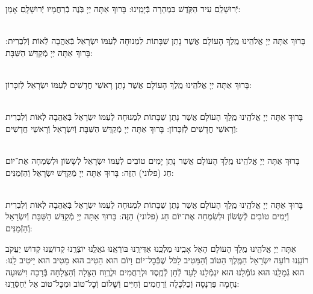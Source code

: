 \documentclass[twoside, openany, parskip=half, 11pt]{book}
\begin{document}
\begin{sometimes}
\begin{sometimes}
\end{sometimes}

יְֿרוּשָׁלַֽםִ עִיר הַקֹּֽדֶשׁ בִּמְהֵרָה בְּֿיָמֵֽינוּ: בָּרוּךְ אַתָּה יְיָ בֹּֽנֶה בְֿרַחֲמָיו יְֿרוּשָׁלָֽםִ אָמֵן:

\begin{sometimes}

\\
בָּרוּךְ אַתָּה יְיָ אֱלֹהֵֽינוּ מֶֽלֶךְ הָעוֹלָם אֲשֶׁר נָתַן שַׁבָּתוֹת לִמְנוּחָה לְֿעַמּוֹ יִשְׂרָאֵל בְּֿאַהֲבָה
לְֿאוֹת וְֿלִבְרִית: בָּרוּךְ אַתָּה יְיָ מְֿקַדֵּשׁ הַשַּׁבָּת:


\\
בָּרוּךְ אַתָּה יְיָ אֱלֹהֵֽינוּ מֶֽלֶךְ הָעוֹלָם
אֲשֶׁר נָתַן רָאשֵׁי חֳדָשִׁים לְֿעַמּוֹ יִשְׂרָאֵל לְֿזִכָּרוֹן:


\\
בָּרוּךְ אַתָּה יְיָ אֱלֹהֵֽינוּ מֶֽלֶךְ הָעוֹלָם
אֲשֶׁר נָתַן שַׁבָּתוֹת לִמְנוּחָה לְֿעַמּוֹ יִשְׂרָאֵל בְּֿאַהֲבָה לְֿאוֹת וְֿלִבְרִית וְֿרָאשֵׁי חֳדָשִׁים לְֿזִכָּרוֹן:
בָּרוּךְ אַתָּה יְיָ מְֿקַדֵּשׁ הַשַּׁבָּת וְֿיִשְׂרָאֵל וְֿרָאשֵׁי חֳדָשִׁים:

\\
בָּרוּךְ אַתָּה יְיָ אֱלֹהֵֽינוּ מֶֽלֶךְ הָעוֹלָם
אֲשֶׁר נָתַן יָמִים טוֹבִים לְֿעַמּוֹ יִשְׂרָאֵל
לְֿשָׂשׂוֹן וּלְשִׂמְחָה אֶת־יוֹם חַג (פלוני) הַזֶּה:
בָּרוּךְ אַתָּה יְיָ מְֿקַדֵּשׁ יִשְׂרָאֵל וְֿהַזְּֿמַנִּים:

\\
בָּרוּךְ אַתָּה יְיָ אֱלֹהֵֽינוּ מֶֽלֶךְ הָעוֹלָם אֲשֶׁר נָתַן שַׁבָּתוֹת לִמְנוּחָה לְֿעַמּוֹ יִשְׂרָאֵל בְּֿאַהֲבָה לְֿאוֹת וְֿלִבְרִית
וְֿיָמִים טוֹבִים לְֿשָׂשׂוֹן וּלְשִׂמְחָה אֶת־יוֹם חַג (פלוני) הַזֶּה:
בָּרוּךְ אַתָּה יְיָ מְֿקַדֵּשׁ הַשַּׁבָּת וְֿיִשְׂרָאֵל וְֿהַזְּֿמַנִּים:

\end{sometimes}


אַתָּה יְיָ אֱלֹהֵֽינוּ מֶֽלֶךְ הָעוֹלָם הָאֵל אָבִֽינוּ מַלְכֵּֽנוּ אַדִּירֵֽנוּ בּוֹרְֿאֵֽנוּ גֹאֲלֵֽנוּ יוֹצְֿרֵֽנוּ קְֿדוֹשֵֽׁנוּ קְֿדוֹשׁ יַעֲקֹב רוֹעֵֽנוּ רוֹעֵה יִשְׂרָאֵל הַמֶּֽלֶךְ הַטּוֹב וְֿהַמֵּטִיב לַכֹּל שֶׁבְּֿכׇל־יוֹם וָיוֹם הוּא הֵטִיב הוּא מֵטִיב הוּא יֵיטִיב לָֽנוּ: הוּא גְֿמָלָֽנוּ הוּא גוֹמְֿלֵנוּ הוּא יִגְמְֿלֵנוּ לָעַד לְֿחֵן לְֿחֶֽסֶד וּלְרַחֲמִים וּלְרֶֽוַח הַצָּלָה וְֿהַצְלָחָה בְּֿרָכָה וִישׁוּעָה נֶחָמָה פַּרְנָסָה וְֿכַלְכָּלָה וְֿרַחֲמִים וְֿחַיִּים וְֿשָׁלוֹם וְֿכׇל־טוֹב וּמִכׇּל־טוֹב אַל יְֿחַסְּֿרֵֽנוּ:




\end{sometimes}
\end{document}
